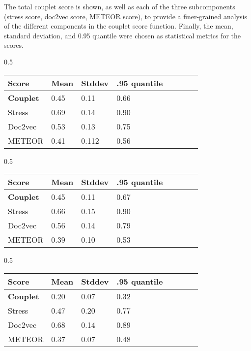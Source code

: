 \documentclass[11pt,a4paper]{article}
\begin{document}
The total couplet score is shown, as well as each of the three subcomponents (stress score, doc2vec score, METEOR score), to provide a finer-grained analysis of the different components in the couplet score function. Finally, the mean, standard deviation, and 0.95 quantile were chosen as statistical metrics for the scores.

\begin{table*}[ht]
\begin{subtable}{0.5\textwidth}
\begin{tabular}{llll c c c c}
	\hline\hline
	Score & Mean & Stddev & .95 quantile \\ [0.5ex]
	\hline
	\textbf{Couplet} & 0.45 & 0.11 & 0.66 \\ [0.5ex]
	\hline
	Stress & 0.69 & 0.14 & 0.90 \\ [0.5ex]
	\hline
	Doc2vec & 0.53 & 0.13 & 0.75 \\ [0.5ex]
	\hline
	METEOR & 0.41 & 0.112 & 0.56 \\ [0.5ex]
	\hline
\end{tabular}
\caption{Gold standard baseline, Gutenberg}
\end{subtable}
\begin{subtable}{0.5\textwidth}
\begin{tabular}{llll c c c c}
	\hline\hline
	Score & Mean & Stddev & .95 quantile \\ [0.5ex]
	\hline
	\textbf{Couplet} & 0.45 & 0.11 & 0.67 \\ [0.5ex]
	\hline
	Stress & 0.66 & 0.15 & 0.90 \\ [0.5ex]
	\hline
	Doc2vec & 0.56 & 0.14 & 0.79 \\ [0.5ex]
	\hline
	METEOR & 0.39 & 0.10 & 0.53 \\ [0.5ex]
	\hline
\end{tabular}
\caption{Silver standard baseline, PoetryFoundation}
\end{subtable}
\begin{subtable}{0.5\textwidth}
\begin{tabular}{llll c c c c}
	\hline\hline
	Score & Mean & Stddev & .95 quantile \\ [0.5ex]
	\hline
	\textbf{Couplet} & 0.20 & 0.07 & 0.32 \\ [0.5ex]
	\hline
	Stress & 0.47 & 0.20 & 0.77 \\ [0.5ex]
	\hline
	Doc2vec & 0.68 & 0.14 & 0.89 \\ [0.5ex]
	\hline
	METEOR & 0.37 & 0.07 & 0.48 \\ [0.5ex]
	\hline
\end{tabular}

\end{subtable}
\end{table*}
\end{document}
